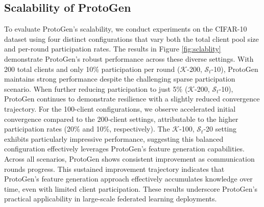 \documentclass[lettersize,journal]{IEEEtran}
\begin{document}
\subsection{Scalability of \textsf{ProtoGen}}
To evaluate \textsf{ProtoGen}'s scalability, we conduct experiments on the CIFAR-10 dataset using four distinct configurations that vary both the total client pool size and per-round participation rates. The results in Figure \ref{fig:sclablity} demonstrate \textsf{ProtoGen}'s robust performance across these diverse settings.
With 200 total clients and only 10\% participation per round ($\mathcal{K}$-200, $\mathcal{S}_t$-10), \textsf{ProtoGen} maintains strong performance despite the challenging sparse participation scenario. When further reducing participation to just 5\% ($\mathcal{K}$-200, $\mathcal{S}_t$-10), \textsf{ProtoGen} continues to demonstrate resilience with a slightly reduced convergence trajectory.
For the 100-client configurations, we observe accelerated initial convergence compared to the 200-client settings, attributable to the higher participation rates (20\% and 10\%, respectively). The $\mathcal{K}$-100, $\mathcal{S}_t$-20 setting exhibits particularly impressive performance, suggesting this balanced configuration effectively leverages \textsf{ProtoGen}'s feature generation capabilities.
Across all scenarios, \textsf{ProtoGen} shows consistent improvement as communication rounds progress. This sustained improvement trajectory indicates that \textsf{ProtoGen}'s feature generation approach effectively accumulates knowledge over time, even with limited client participation.
These results underscore \textsf{ProtoGen}'s practical applicability in large-scale federated learning deployments.
\end{document}

